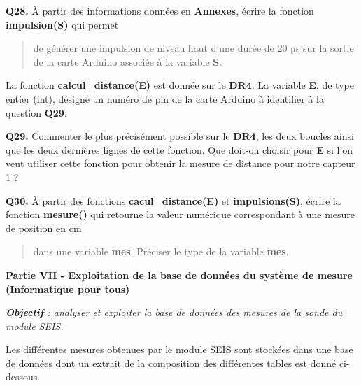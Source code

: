 \documentclass[]{article}
\begin{document}
\textbf{Q28.} À partir des informations données en \textbf{Annexes},
écrire la fonction \textbf{impulsion(S)} qui permet

\begin{quote}
de générer une impulsion de niveau haut d'une durée de 20 µs sur la
sortie de la carte Arduino associée à la variable \textbf{S}.
\end{quote}

La fonction \textbf{calcul\_distance(E)} est donnée sur le \textbf{DR4}.
La variable \textbf{E}, de type entier (int), désigne un numéro de pin
de la carte Arduino à identifier à la question \textbf{Q29}.

\protect\hypertarget{page15}{}{}\textbf{Q29.} Commenter le plus
précisément possible sur le \textbf{DR4}, les deux boucles ainsi que les
deux dernières lignes de cette fonction. Que doit-on choisir pour
\textbf{E} si l'on veut utiliser cette fonction pour obtenir la mesure
de distance pour notre capteur 1 ?

\textbf{Q30.} À partir des fonctions \textbf{cacul\_distance(E)} et
\textbf{impulsions(S)}, écrire la fonction \textbf{mesure()} qui
retourne la valeur numérique correspondant à une mesure de position en
cm

\begin{quote}
dans une variable \textbf{mes}. Préciser le type de la variable
\textbf{mes}.
\end{quote}

\textbf{Partie VII - Exploitation de la base de données du système de
mesure (Informatique pour tous)}

\emph{\textbf{Objectif} : analyser et exploiter la base de données des
mesures de la sonde du module SEIS.}

Les différentes mesures obtenues par le module SEIS sont stockées dans
une base de données dont un extrait de la composition des différentes
tables est donné ci-dessous.
\end{document}
